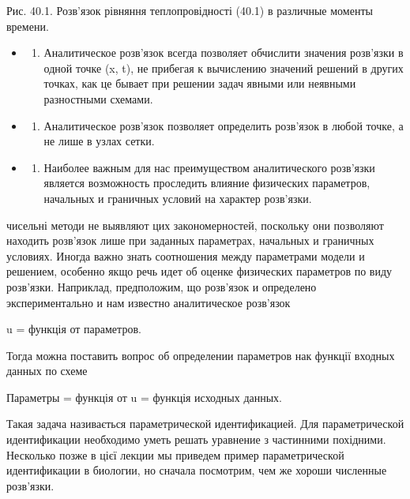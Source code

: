 \documentclass[
  ukrainian,
]{article}
\providecommand{\tightlist}{%
  \setlength{\itemsep}{0pt}\setlength{\parskip}{0pt}}
\begin{document}
Рис. 40.1. Розв'язок рівняння теплопровідності (40.1) в различные
моменты времени.

\begin{itemize}
\tightlist
\item
  \begin{enumerate}
  \def\labelenumi{\arabic{enumi}.}
  \setcounter{enumi}{1}
  \tightlist
  \item
    Аналитическое розв'язок всегда позволяет обчислити значения
    розв'язки в одной точке (x, t), не прибегая к вычислению значений
    решений в других точках, как це бывает при решении задач явными или
    неявными разностными схемами.
  \end{enumerate}
\item
  \begin{enumerate}
  \def\labelenumi{\arabic{enumi}.}
  \setcounter{enumi}{2}
  \tightlist
  \item
    Аналитическое розв'язок позволяет определить розв'язок в любой
    точке, а не лише в узлах сетки.
  \end{enumerate}
\item
  \begin{enumerate}
  \def\labelenumi{\arabic{enumi}.}
  \setcounter{enumi}{3}
  \tightlist
  \item
    Наиболее важным для нас преимуществом аналитического розв'язки
    является возможность проследить влияние физических параметров,
    начальных и граничных условий на характер розв'язки.
  \end{enumerate}
\end{itemize}

чисельні методи не выявляют цих закономерностей, поскольку они позволяют
находить розв'язок лише при заданных параметрах, начальных и граничных
условиях. Иногда важно знать соотношения между параметрами модели и
решением, особенно якщо речь идет об оценке физических параметров по
виду розв'язки. Наприклад, предположим, що розв'язок и определено
экспериментально и нам известно аналитическое розв'язок

u = функція от параметров.

Тогда можна поставить вопрос об определении параметров нак функції
входных данных по схеме

Параметры = функція от u = функція исходных данных.

Такая задача називається параметрической идентификацией. Для
параметрической идентификации необходимо уметь решать уравнение з
частинними похідними. Несколько позже в цієї лекции мы приведем пример
параметрической идентификации в биологии, но сначала посмотрим, чем же
хороши численные розв'язки.
\end{document}

